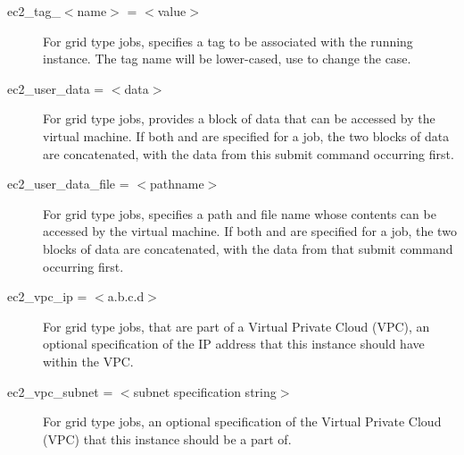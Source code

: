 \begin{description}

\item[ec2\_tag\_$<$name$>$ = $<$value$>$]
For grid type  jobs, 
specifies a tag to be associated with the running instance.
The tag name will be lower-cased, use  to
change the case.


\label{condor-submit-ec2-user-data}
\item[ec2\_user\_data = $<$data$>$]
For grid type  jobs, 
provides a block of data that can be accessed by the virtual machine.
If both  and 
 are specified for a job,
the two blocks of data are concatenated, 
with the data from this  submit command 
occurring first.


\label{condor-submit-ec2-user-data-file}
\item[ec2\_user\_data\_file = $<$pathname$>$]
For grid type  jobs, 
specifies a path and file name whose contents can be 
accessed by the virtual machine.
If both  and 
 are specified for a job,
the two blocks of data are concatenated, 
with the data from that  submit command 
occurring first.


\label{condor-submit-ec2-vpc-ip}
\item[ec2\_vpc\_ip = $<$a.b.c.d$>$]
For grid type  jobs, 
that are part of a Virtual Private Cloud (VPC),
an optional specification of the IP address that this instance should have 
within the VPC.


\label{condor-submit-ec2-vpc-subnet}
\item[ec2\_vpc\_subnet = $<$subnet specification string$>$]
For grid type  jobs, 
an optional specification of the Virtual Private Cloud (VPC) that
this instance should be a part of.


\end{description}
